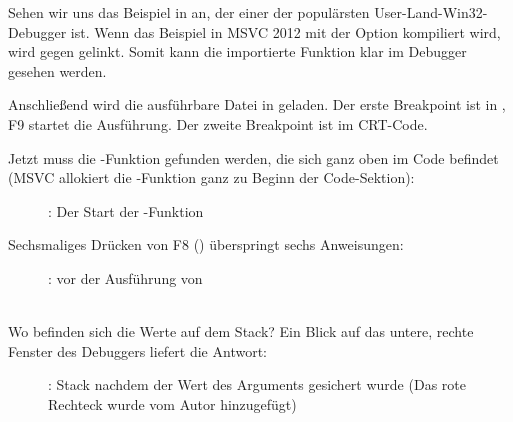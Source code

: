 Sehen wir uns das Beispiel in \olly an, der einer der populärsten User-Land-Win32-Debugger ist.
Wenn das Beispiel in MSVC 2012 mit der Option  kompiliert wird, wird gegen  gelinkt.
Somit kann die importierte Funktion klar im Debugger gesehen werden.

Anschließend wird die ausführbare Datei in \olly geladen.
Der erste Breakpoint ist in , F9 startet die Ausführung.
Der zweite Breakpoint ist im \ac{CRT}-Code.

Jetzt muss die \main-Funktion gefunden werden, die sich ganz oben im Code befindet
(MSVC allokiert die \main-Funktion ganz zu Beginn der Code-Sektion): 
\begin{figure}[H]
\centering
{}
\caption{\olly: Der Start der \main-Funktion}
\label{fig:printf3_olly_1}
\end{figure}


\clearpage
Sechsmaliges Drücken von F8 (\stepover) überspringt sechs Anweisungen:

\begin{figure}[H]
\centering
{}
\caption{\olly: vor der Ausführung von\printf}
\label{fig:printf3_olly_2}
\end{figure}

\\
Wo befinden sich die Werte auf dem Stack? Ein Blick auf das untere, rechte Fenster
des Debuggers liefert die Antwort:

\begin{figure}[H]
\centering

\caption{\olly: Stack nachdem der Wert des Arguments gesichert wurde (Das rote Rechteck wurde vom Autor hinzugefügt)}
\end{figure}


